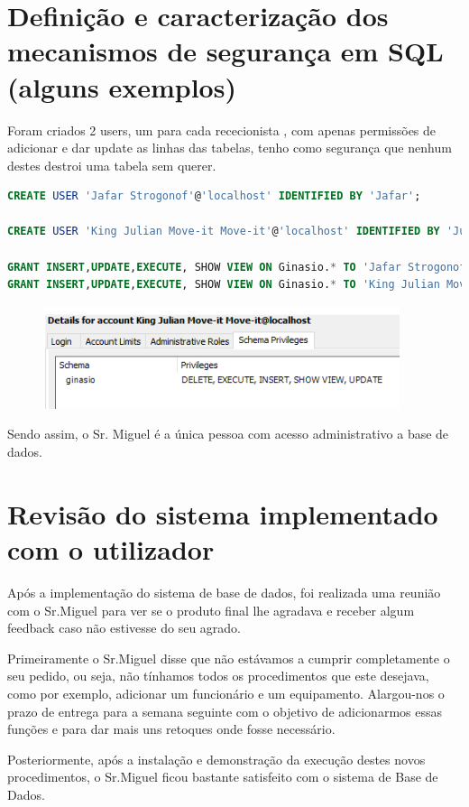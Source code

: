 \section{Definição e caracterização dos mecanismos de segurança em SQL (alguns exemplos)}
Foram criados 2 users, um para cada rececionista , com apenas permissões de adicionar e dar update as linhas das tabelas, tenho como segurança que nenhum destes destroi uma tabela sem querer.
\begin{lstlisting}[language=SQL]
CREATE USER 'Jafar Strogonof'@'localhost' IDENTIFIED BY 'Jafar';

CREATE USER 'King Julian Move-it Move-it'@'localhost' IDENTIFIED BY 'Julian';

GRANT INSERT,UPDATE,EXECUTE, SHOW VIEW ON Ginasio.* TO 'Jafar Strogonof'@'localhost';
GRANT INSERT,UPDATE,EXECUTE, SHOW VIEW ON Ginasio.* TO 'King Julian Move-it Move-it'@'localhost';
\end{lstlisting}

\begin{figure}[h]
\begin{center}
\includegraphics[scale=1.0]{implementacao_fisica/Previlegios.png}
\centering
\end{center}
\end{figure}
\par Sendo assim, o Sr. Miguel é a única pessoa com acesso administrativo a base de dados.

\section{Revisão do sistema implementado com o utilizador}
Após a implementação do sistema de base de dados, foi realizada uma reunião com o Sr.Miguel para ver se o produto final lhe agradava e receber algum feedback caso não estivesse do seu agrado.
\par Primeiramente o Sr.Miguel disse que não estávamos a cumprir completamente o seu pedido, ou seja, não tínhamos todos os procedimentos que este desejava, como por exemplo, adicionar um funcionário e um equipamento. Alargou-nos o prazo de entrega para a semana seguinte com o objetivo de  adicionarmos essas funções e para dar mais uns retoques onde fosse necessário.
\par Posteriormente, após a instalação e demonstração da execução destes novos procedimentos, o  Sr.Miguel ficou bastante satisfeito com o sistema de Base de Dados.
